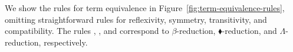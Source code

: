 
We show the rules for term equivalence  in
Figure~\ref{fig:term-equivalence-rules}, omitting
straightforward rules for reflexivity, symmetry, transitivity,
and compatibility.
The rules \QBeta, \QTBLTB, and \QLambda{} correspond to
$\beta$-reduction, $\blacklozenge$-reduction, and $\Lambda$-reduction, respectively.

